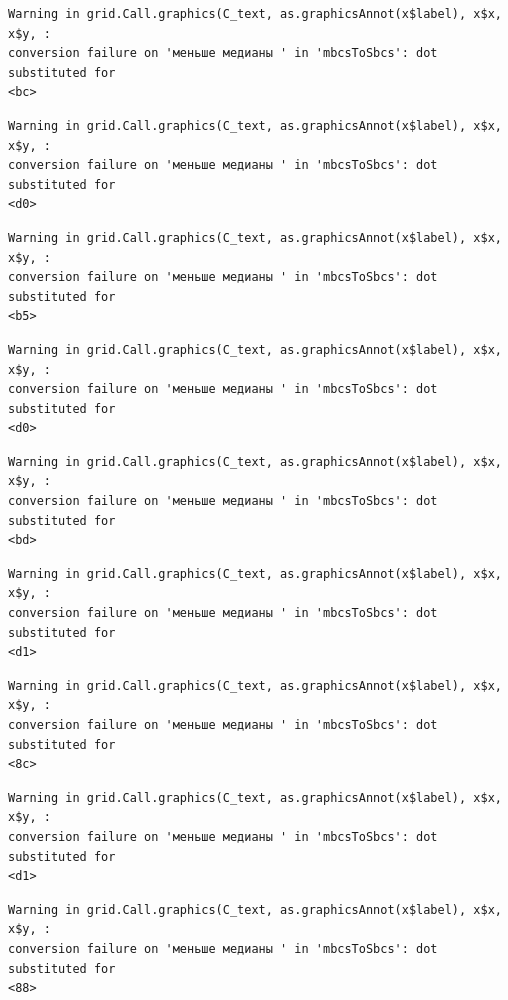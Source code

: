 \documentclass[
  letterpaper,
]{scrbook}
\theoremstyle{definition}
\theoremstyle{remark}
\begin{document}
\begin{verbatim}
Warning in grid.Call.graphics(C_text, as.graphicsAnnot(x$label), x$x, x$y, :
conversion failure on 'меньше медианы ' in 'mbcsToSbcs': dot substituted for
<bc>
\end{verbatim}

\begin{verbatim}
Warning in grid.Call.graphics(C_text, as.graphicsAnnot(x$label), x$x, x$y, :
conversion failure on 'меньше медианы ' in 'mbcsToSbcs': dot substituted for
<d0>
\end{verbatim}

\begin{verbatim}
Warning in grid.Call.graphics(C_text, as.graphicsAnnot(x$label), x$x, x$y, :
conversion failure on 'меньше медианы ' in 'mbcsToSbcs': dot substituted for
<b5>
\end{verbatim}

\begin{verbatim}
Warning in grid.Call.graphics(C_text, as.graphicsAnnot(x$label), x$x, x$y, :
conversion failure on 'меньше медианы ' in 'mbcsToSbcs': dot substituted for
<d0>
\end{verbatim}

\begin{verbatim}
Warning in grid.Call.graphics(C_text, as.graphicsAnnot(x$label), x$x, x$y, :
conversion failure on 'меньше медианы ' in 'mbcsToSbcs': dot substituted for
<bd>
\end{verbatim}

\begin{verbatim}
Warning in grid.Call.graphics(C_text, as.graphicsAnnot(x$label), x$x, x$y, :
conversion failure on 'меньше медианы ' in 'mbcsToSbcs': dot substituted for
<d1>
\end{verbatim}

\begin{verbatim}
Warning in grid.Call.graphics(C_text, as.graphicsAnnot(x$label), x$x, x$y, :
conversion failure on 'меньше медианы ' in 'mbcsToSbcs': dot substituted for
<8c>
\end{verbatim}

\begin{verbatim}
Warning in grid.Call.graphics(C_text, as.graphicsAnnot(x$label), x$x, x$y, :
conversion failure on 'меньше медианы ' in 'mbcsToSbcs': dot substituted for
<d1>
\end{verbatim}

\begin{verbatim}
Warning in grid.Call.graphics(C_text, as.graphicsAnnot(x$label), x$x, x$y, :
conversion failure on 'меньше медианы ' in 'mbcsToSbcs': dot substituted for
<88>
\end{verbatim}
\end{document}
